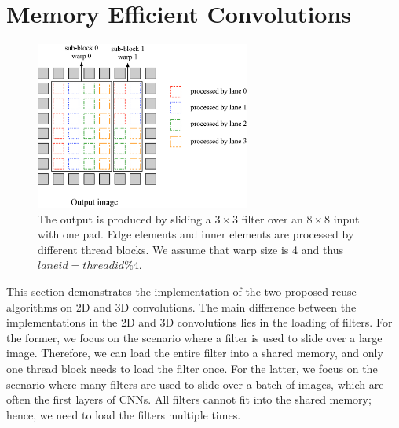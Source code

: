 \section{Memory Efficient Convolutions}
\begin{figure}
	\centering
	\includegraphics[width=0.9\columnwidth,height=5.5cm]{./figure/overalldesign.eps}
\caption{The output is produced by sliding a $3 \times 3$ filter over an $8 \times 8$ input with one pad. Edge elements and inner elements are processed by different {\color{red}thread blocks}. We assume that {\color{red}warp size} is 4 and thus $laneid=threadid\%4$.}
\label{fig:overalldesign}
\end{figure}


This section demonstrates the implementation of the two proposed reuse algorithms on 2D and 3D convolutions. The main difference between the 
implementations in the 2D and 3D convolutions lies in the loading of filters. For the former, we focus on the scenario where a filter is used to
slide over a large image. Therefore, we can load the entire filter into a shared memory, and only one thread block needs to load the
filter once. For the latter, we focus on the scenario where many filters are used to slide over a batch of images, which are often the
first layers of CNNs. All filters cannot fit into the shared memory; hence, we need to load the filters multiple times.

